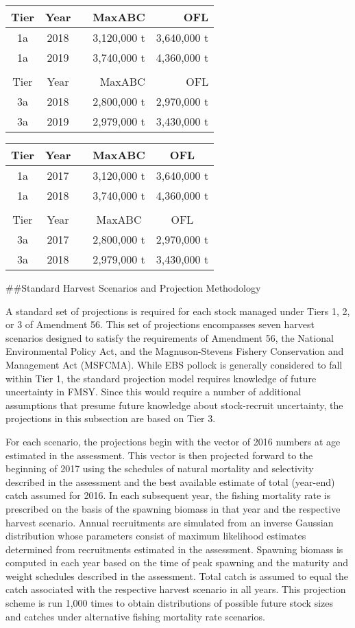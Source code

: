 \begin{longtable}[]{@{}ccrrr@{}}
\toprule
Tier & Year & & MaxABC & OFL\tabularnewline
\midrule
\endhead
1a & 2018 & & 3,120,000 t & 3,640,000 t\tabularnewline
1a & 2019 & & 3,740,000 t & 4,360,000 t\tabularnewline
& & & &\tabularnewline
Tier & Year & & MaxABC & OFL\tabularnewline
3a & 2018 & & 2,800,000 t & 2,970,000 t\tabularnewline
3a & 2019 & & 2,979,000 t & 3,430,000 t\tabularnewline
\bottomrule
\end{longtable}

\begin{longtable}[]{@{}ccccc@{}}
\toprule
Tier & Year & & MaxABC & OFL\tabularnewline
\midrule
\endhead
1a & 2017 & & 3,120,000 t & 3,640,000 t\tabularnewline
1a & 2018 & & 3,740,000 t & 4,360,000 t\tabularnewline
& & & &\tabularnewline
Tier & Year & & MaxABC & OFL\tabularnewline
3a & 2017 & & 2,800,000 t & 2,970,000 t\tabularnewline
3a & 2018 & & 2,979,000 t & 3,430,000 t\tabularnewline
\bottomrule
\end{longtable}

\#\#Standard Harvest Scenarios and Projection Methodology

A standard set of projections is required for each stock managed under
Tiers 1, 2, or 3 of Amendment 56. This set of projections encompasses
seven harvest scenarios designed to satisfy the requirements of
Amendment 56, the National Environmental Policy Act, and the
Magnuson-Stevens Fishery Conservation and Management Act (MSFCMA). While
EBS pollock is generally considered to fall within Tier 1, the standard
projection model requires knowledge of future uncertainty in FMSY. Since
this would require a number of additional assumptions that presume
future knowledge about stock-recruit uncertainty, the projections in
this subsection are based on Tier 3.

For each scenario, the projections begin with the vector of 2016 numbers
at age estimated in the assessment. This vector is then projected
forward to the beginning of 2017 using the schedules of natural
mortality and selectivity described in the assessment and the best
available estimate of total (year-end) catch assumed for 2016. In each
subsequent year, the fishing mortality rate is prescribed on the basis
of the spawning biomass in that year and the respective harvest
scenario. Annual recruitments are simulated from an inverse Gaussian
distribution whose parameters consist of maximum likelihood estimates
determined from recruitments estimated in the assessment. Spawning
biomass is computed in each year based on the time of peak spawning and
the maturity and weight schedules described in the assessment. Total
catch is assumed to equal the catch associated with the respective
harvest scenario in all years. This projection scheme is run 1,000 times
to obtain distributions of possible future stock sizes and catches under
alternative fishing mortality rate scenarios.

